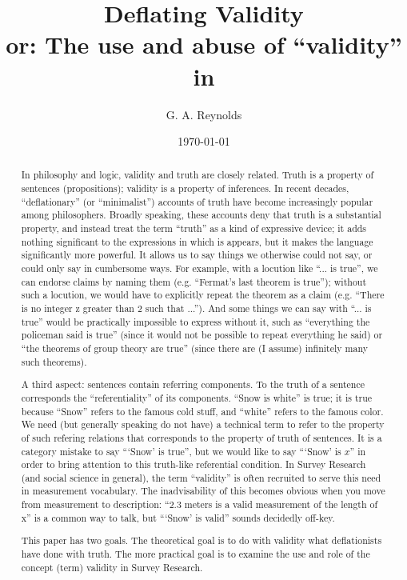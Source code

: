 \documentclass[11pt,twoside]{article}
\title{Deflating Validity \\
\vspace{12pt}\large{or: The use and abuse of \enquote{validity} in \sr{}}}
\author{G. A. Reynolds}
\date{\today}
\newcommand{\SR}{Survey Research}
\begin{document}
\maketitle
\nocite{*}

\begin{abstract}
In philosophy and logic, validity and truth are closely related.
Truth is a property of sentences (propositions); validity is a
property of inferences.  In recent decades, ``deflationary'' (or
``minimalist'') accounts of truth have become increasingly popular
among philosophers.  Broadly speaking, these accounts deny that truth
is a substantial property, and instead treat the term ``truth'' as a
kind of expressive device; it adds nothing significant to the
expressions in which is appears, but it makes the language
significantly more powerful.  It allows us to say things we
otherwise could not say, or could only say in cumbersome ways.  For
example, with a locution like ``... is true'', we can endorse claims
by naming them (e.g. ``Fermat's last theorem is true''); without such
a locution, we would have to explicitly repeat the theorem as a claim
(e.g. ``There is no integer z greater than 2 such that ...'').  And
some things we can say with ``... is true'' would be practically
impossible to express without it, such as ``everything the policeman
said is true'' (since it would not be possible to repeat everything he
said) or ``the theorems of group theory are true'' (since there are (I
assume) infinitely many such theorems).

A third aspect: sentences contain referring components.  To the truth
of a sentence corresponds the ``referentiality'' of its components.
``Snow is white'' is true; it is true because ``Snow'' refers to the
famous cold stuff, and ``white'' refers to the famous color.  We need
(but generally speaking do not have) a technical term to refer to the
property of such refering relations that corresponds to the property
of truth of sentences.  It is a category mistake to say ```Snow' is
true'', but we would like to say ```Snow' is $x$'' in order to bring
attention to this truth-like referential condition.  In \SR{} (and
social science in general), the term ``validity'' is often recruited
to serve this need in measurement vocabulary.  The inadvisability of
this becomes obvious when you move from measurement to description:
``2.3 meters is a valid measurement of the length of x'' is a common
way to talk, but ```Snow' is valid'' sounds decidedly off-key.

This paper has two goals.  The theoretical goal is to do with validity
what deflationists have done with truth.  The more practical goal is to
examine the use and role of the concept (term) validity in \SR{}.


\end{abstract}
\end{document}
